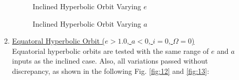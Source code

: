 \begin{itemize}
\begin{enumerate}
\begin{figure}[H]
			\caption{Inclined Hyperbolic Orbit Varying $e$}
		\end{figure}
		\begin{figure}[H] \label{fig:11}
			\centering
			\caption{Inclined Hyperbolic Orbit Varying $a$}
		\end{figure}
		\pagebreak
		\item \underline{Equatoral Hyperbolic Orbit ($e>1.0$, \quad $a<0$, \quad $i=0$, \quad $\Omega = 0$)}\\
		Equatorial hyperbolic orbits are tested with the same range of $e$ and $a$ inputs as the inclined case. Also, all variations passed without discrepancy, as shown in the following Fig. \ref{fig:12} and \ref{fig:13}:
		\begin{figure}[H]
			\centering

\end{figure}
\end{enumerate}
\end{itemize}
